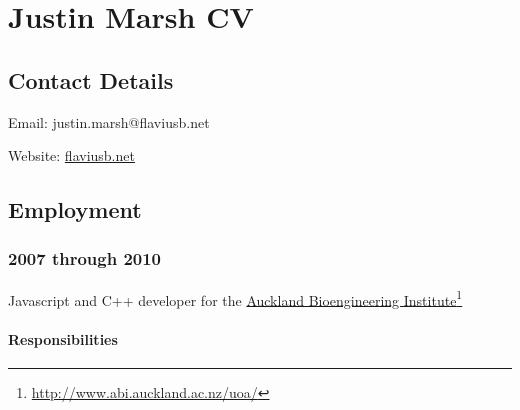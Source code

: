 \documentclass[10pt,oneside]{memoir}
\title{\mytitle}
\author{\myauthor}
\def\mychapterstyle{article}
\def\mypagestyle{headings}
\begin{document}
\chapterstyle{\mychapterstyle}
\pagestyle{\mypagestyle}

%
%

\frontmatter




%
%


\setlength{\parindent}{0em}

\mainmatter
\chapter*{Justin Marsh CV}
\label{justinmarsh}

{}
\section*{Contact Details}
\label{contactdetails}

Email: justin.marsh@flaviusb.net

Website: \href{http://flaviusb.net}{flaviusb.net}


{}
\section*{Employment}
\label{employment}

\subsection*{2007 through 2010}
\label{through2010}

Javascript and C++ developer for the \href{http://www.abi.auckland.ac.nz/uoa/}{Auckland Bioengineering Institute}\footnote{\href{http://www.abi.auckland.ac.nz/uoa/}{http://www.abi.auckland.ac.nz/uoa/}}


\subsubsection*{Responsibilities}
\label{responsibilities}
\end{document}
